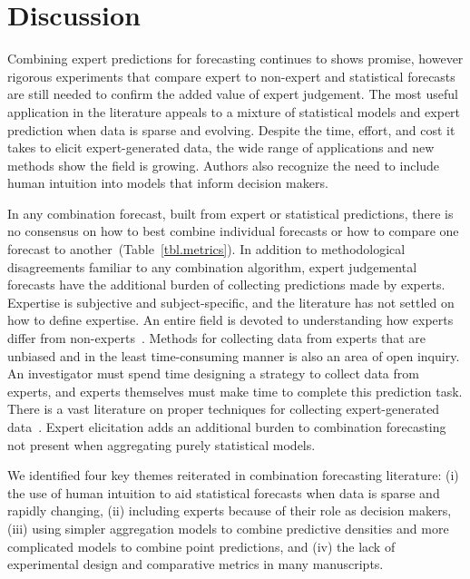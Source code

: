 \documentclass[preprint,authoryear,nonatbib]{elsarticle}
\begin{document}
\section{Discussion}


\label{sec.discussion}

Combining expert predictions for forecasting continues to shows promise, however rigorous experiments that compare expert to non-expert and statistical forecasts are still needed to confirm the added value of expert judgement.
The most useful application in the literature appeals to a mixture of statistical models and expert prediction when data is sparse and evolving.
Despite the time, effort, and cost it takes to elicit expert-generated data, the wide range of applications and new methods show the field is growing.
Authors also recognize the need to include human intuition into models that inform decision makers.

In any combination forecast, built from expert or statistical predictions, there is no consensus on how to best combine individual forecasts or how to compare one forecast to another~(Table~\ref{tbl.metrics}).
In addition to methodological disagreements familiar to any combination algorithm, expert judgemental forecasts have the additional burden of collecting predictions made by experts.
Expertise is subjective and subject-specific, and the literature has not settled on how to define expertise.
An entire field is devoted to understanding how experts differ from non-experts~\parencite{dawid1995coherent,farrington2006nature,ericsson2007capturing,rikers2005recent,de2014thought}.
Methods for collecting data from experts that are unbiased and in the least time-consuming manner is also an area of open inquiry.
An investigator must spend time designing a strategy to collect data from experts, and experts themselves must make time to complete this prediction task. 
There is a vast literature on proper techniques for collecting expert-generated data~\parencite{ayyub2001elicitation,yousuf2007using,powell2003delphi,normand1998eliciting,leal2007eliciting,martin2012eliciting}.
Expert elicitation adds an additional burden to combination forecasting not present when aggregating purely statistical models.

We identified four key themes reiterated in combination forecasting literature: (i) the use of human intuition to aid statistical forecasts when data is sparse and rapidly changing, (ii) including experts because of their role as decision makers, (iii) using simpler aggregation models to combine predictive densities and more complicated models to combine point predictions, and (iv) the lack of experimental design and comparative metrics in many manuscripts.
\end{document}
